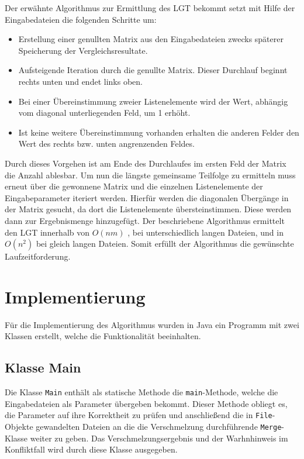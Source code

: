 \documentclass[a4paper,titlepage,12pt]{scrartcl}
\begin{document}
Der erwähnte Algorithmus zur Ermittlung des LGT bekommt setzt mit Hilfe der Eingabedateien die folgenden Schritte um:

\begin{itemize}
\item Erstellung einer genullten Matrix aus den Eingabedateien zwecks späterer Speicherung der Vergleichsresultate.
\item Aufsteigende Iteration durch die genullte Matrix. Dieser Durchlauf beginnt rechts unten und endet links oben.
\item Bei einer Übereinstimmung zweier Listenelemente wird der Wert, abhängig vom diagonal unterliegenden Feld, um 1 erhöht.
\item Ist keine weitere Übereinstimmung vorhanden erhalten die anderen Felder den Wert des rechts bzw. unten angrenzenden Feldes.
\end{itemize}

Durch dieses Vorgehen ist am Ende des Durchlaufes im ersten Feld der Matrix die Anzahl ablesbar.
Um nun die längste gemeinsame Teilfolge zu ermitteln muss erneut über die gewonnene Matrix und die einzelnen Listenelemente der Eingabeparameter iteriert werden.
Hierfür werden die diagonalen Übergänge in der Matrix gesucht, da dort die Listenelemente übersteinstimmen. Diese werden dann zur Ergebnismenge hinzugefügt.
Der beschriebene Algorithmus ermittelt den LGT innerhalb von $O(nm)$ , bei unterschiedlich langen Dateien, und in $O(n^2)$ bei gleich langen Dateien. Somit erfüllt der Algorithmus die gewünschte Laufzeitforderung.


\section{Implementierung}
\label{sec:implementation}
Für die Implementierung des Algorithmus wurden in Java ein Programm mit zwei Klassen erstellt, welche die Funktionalität beeinhalten.

\subsection{Klasse Main}
\label{sec:classmain}
Die Klasse \texttt{Main} enthält als statische Methode die \texttt{main}-Methode, welche die Eingabedateien als Parameter übergeben bekommt.
Dieser Methode obliegt es, die Parameter auf ihre Korrektheit zu prüfen und anschließend die in \texttt{File}-Objekte gewandelten Dateien
an die die Verschmelzung durchführende \texttt{Merge}-Klasse weiter zu geben.
Das Verschmelzungsergebnis und der Warhnhinweis im Konfliktfall wird durch diese Klasse ausgegeben.
\end{document}
